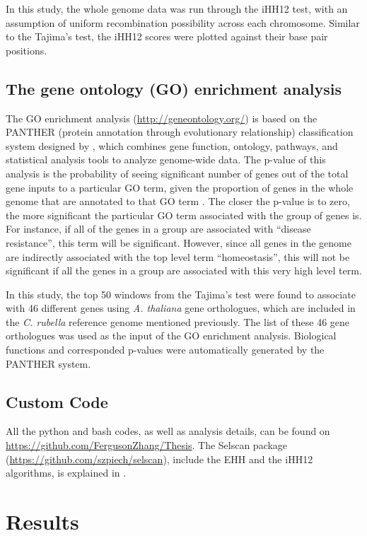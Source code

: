 In this study, the whole genome data was run through the iHH12 test, with an assumption of uniform recombination possibility across each chromosome. Similar to the Tajima’s test, the iHH12 scores were plotted against their base pair positions.

\subsection{The gene ontology (GO) enrichment analysis}
The GO enrichment analysis (\url{http://geneontology.org/}) is based on the PANTHER (protein annotation through evolutionary relationship) classification system designed by \citet{RN17}, which combines gene function, ontology, pathways, and statistical analysis tools to analyze genome-wide data. The p-value of this analysis is the probability of seeing significant number of genes out of the total gene inputs to a particular GO term, given the proportion of genes in the whole genome that are annotated to that GO term \citep{RN17}. The closer the p-value is to zero, the more significant the particular GO term associated with the group of genes is. For instance, if all of the genes in a group are associated with “disease resistance”, this term will be significant. However, since all genes in the genome are indirectly associated with the top level term “homeostasis”, this will not be significant if all the genes in a group are associated with this very high level term.

In this study, the top 50 windows from the Tajima’s test were found to associate with 46 different genes using \emph{A. thaliana} gene orthologues, which are included in the \emph{C. rubella} reference genome mentioned previously. The list of these 46 gene orthologues was used as the input of the GO enrichment analysis. Biological functions and corresponded p-values were automatically generated by the PANTHER system.

\subsection{Custom Code}
All the python and bash codes, as well as analysis details, can be found on \url{https://github.com/FergusonZhang/Thesis}. The Selscan package (\url{https://github.com/szpiech/selscan}), include the EHH and the iHH12 algorithms, is explained in \citet{RN15}.

\section{Results}
